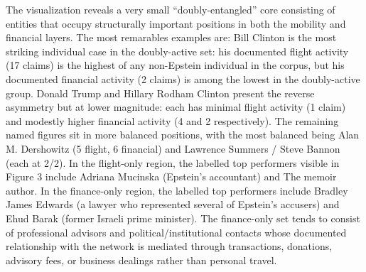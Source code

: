 The visualization reveals a very small ``doubly-entangled'' core consisting of entities that occupy structurally important positions in both the mobility and financial layers. The most remarables examples are:
Bill Clinton is the most striking individual case in the doubly-active set: his documented flight activity (17 claims) is the highest of any non-Epstein individual in the corpus, but his documented financial activity (2 claims) is among the lowest in the doubly-active group.
Donald Trump and Hillary Rodham Clinton present the reverse asymmetry but at lower magnitude: each has minimal flight activity (1 claim) and modestly higher financial activity (4 and 2 respectively). The remaining named figures sit in more balanced positions, with the most balanced being Alan M. Dershowitz (5 flight, 6 financial) and Lawrence Summers / Steve Bannon (each at 2/2).
In the flight-only region, the labelled top performers visible in Figure 3 include Adriana Mucinska (Epstein's accountant) and The memoir author.
In the finance-only region, the labelled top performers include Bradley James Edwards (a lawyer who represented several of Epstein's accusers) and Ehud Barak (former Israeli prime minister). The finance-only set tends to consist of professional advisors and political/institutional contacts whose documented relationship with the network is mediated through transactions, donations, advisory fees, or business dealings rather than personal travel.
